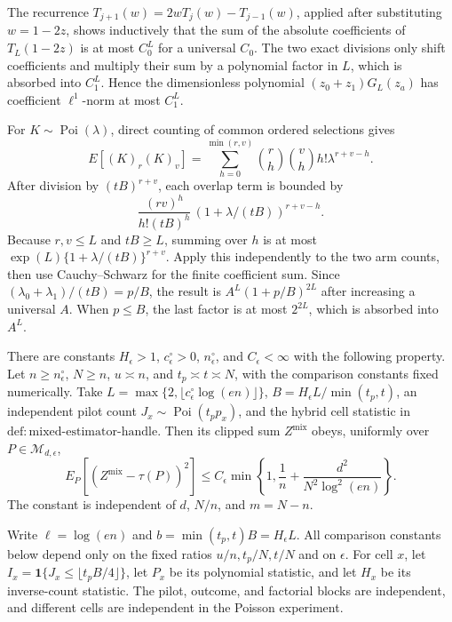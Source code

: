 The recurrence \(T_{j+1}(w)=2wT_j(w)-T_{j-1}(w)\), applied after substituting \(w=1-2z\), shows inductively that the sum of the absolute coefficients of \(T_L(1-2z)\) is at most \(C_0^L\) for a universal \(C_0\).  The two exact divisions only shift coefficients and multiply their sum by a polynomial factor in \(L\), which is absorbed into \(C_1^L\).  Hence the dimensionless polynomial \((z_0+z_1)G_L(z_a)\) has coefficient \(\ell^1\)-norm at most \(C_1^L\).

For \(K\sim\operatorname{Poi}(\lambda)\), direct counting of common ordered selections gives
\[
 E[(K)_r(K)_v]=\sum_{h=0}^{\min(r,v)}\binom rh\binom vh h!\lambda^{r+v-h}.
\]
After division by \((tB)^{r+v}\), each overlap term is bounded by
\[
 \frac{(rv)^h}{h!(tB)^h}\,(1+\lambda/(tB))^{r+v-h}.
\]
Because \(r,v\le L\) and \(tB\ge L\), summing over \(h\) is at most \(\exp(L)\{1+\lambda/(tB)\}^{r+v}\).  Apply this independently to the two arm counts, then use Cauchy--Schwarz for the finite coefficient sum.  Since \((\lambda_0+\lambda_1)/(tB)=p/B\), the result is \(A^L(1+p/B)^{2L}\) after increasing a universal \(A\).  When \(p\le B\), the last factor is at most \(2^{2L}\), which is absorbed into \(A^L\).

There are constants \(H_\epsilon>1\), \(c_\epsilon^\circ>0\), \(n_\epsilon^\circ\), and \(C_\epsilon<\infty\) with the following property.  Let \(n\ge n_\epsilon^\circ\), \(N\ge n\), \(u\asymp n\), and \(t_p\asymp t\asymp N\), with the comparison constants fixed numerically.  Take \(L=\max\{2,\lfloor c_\epsilon^\circ\log(en)\rfloor\}\), \(B=H_\epsilon L/\min(t_p,t)\), an independent pilot count \(J_x\sim\operatorname{Poi}(t_pp_x)\), and the hybrid cell statistic in \(\mathrm{def:mixed\mbox{-}estimator\mbox{-}handle}\).  Then its clipped sum \(Z^{\mathrm{mix}}\) obeys, uniformly over \(P\in\mathcal M_{d,\epsilon}\),
\[
 E_P[(Z^{\mathrm{mix}}-\tau(P))^2]
 \le C_\epsilon\min\!\left\{1,\frac1n+\frac{d^2}{N^2\log^2(en)}\right\}.
\]
The constant is independent of \(d\), \(N/n\), and \(m=N-n\).

Write \(\ell=\log(en)\) and \(b=\min(t_p,t)B=H_\epsilon L\).  All comparison constants below depend only on the fixed ratios \(u/n,t_p/N,t/N\) and on \(\epsilon\).  For cell \(x\), let \(I_x=\mathbf1\{J_x\le\lfloor t_pB/4\rfloor\}\), let \(P_x\) be its polynomial statistic, and let \(H_x\) be its inverse-count statistic.  The pilot, outcome, and factorial blocks are independent, and different cells are independent in the Poisson experiment.

